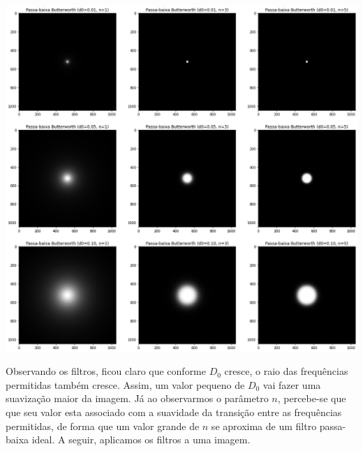 \documentclass[12pt,a4paper]{article}
\begin{document}
\vspace{1em}
\begin{center}
	\includegraphics[width=\textwidth]{filtros_low_pass}
\end{center}
\vspace{1em}

Observando os filtros, ficou claro que conforme $D_0$ cresce, o raio das frequências permitidas também cresce. Assim, um valor pequeno de $D_0$ vai fazer uma suavização maior da imagem. Já ao observarmos o parâmetro $n$, percebe-se que que seu valor esta associado com a suavidade da transição entre as frequências permitidas, de forma que um valor grande de $n$ se aproxima de um filtro passa-baixa ideal. A seguir, aplicamos os filtros a uma imagem.
\end{document}
